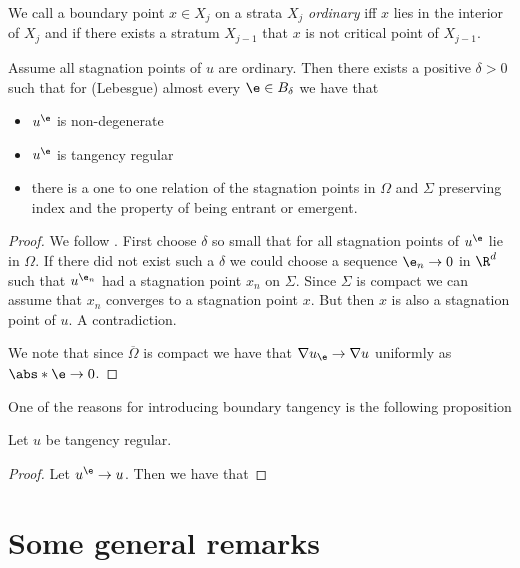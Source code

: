 We call a boundary point $x\in X_j$ on a strata $X_j$ \emph{ordinary} iff $x$ lies
in the interior of $X_j$ and if there exists a stratum $X_{j-1}$ that $x$ is not critical point of $X_{j-1}$.
\begin{proposition}\label{pr:approximationU}
  Assume all stagnation points of $u$ are
  ordinary. Then there exists a positive $\delta>0$ such that
  for (Lebesgue) almost every $\e\in B_\delta$ we have that
  \begin{itemize}
    \item $u^\e$ is non-degenerate
    \item $u^\e$ is tangency regular
    \item there is a one to one relation of the stagnation points in $\Omega$ and $\Sigma$ preserving
      index and the property of being entrant or emergent.
  \end{itemize}
\end{proposition}
\begin{proof}
  We follow \cite[text]{Morse1970}.
  First choose $\delta$ so small that for all stagnation points of $u^\e$ lie in $\Omega$.
  If there did not exist such a $\delta$ we could choose a sequence $\e_n\to0$ in $\R^d$ such 
  that $u^{\e_n}$ had a stagnation point $x_n$ on $\Sigma$. Since $\Sigma$ is compact we can assume that $x_n$ converges
  to a stagnation point $x$. But then $x$ is also a stagnation point of $u$. A contradiction.

  

  We note that since $\overline{\Omega}$ is compact we have that $\nabla u_\e\to \nabla u$ 
  uniformly as $\abs*{\e}\to0$.
\end{proof}

One of the reasons for introducing boundary tangency is the following proposition 
\begin{proposition}
  Let $u$ be tangency regular.
\end{proposition}
\begin{proof}
  Let $u^\e\to u$. Then we have that 
\end{proof}

\section{Some general remarks}

